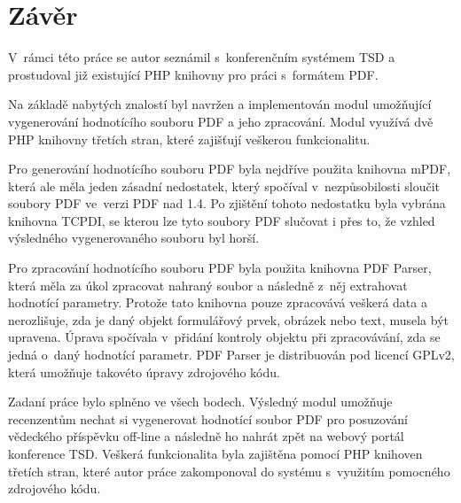 \chapter{Závěr}
 V~rámci této práce se autor seznámil s~konferenčním systémem TSD a prostudoval již existující PHP knihovny pro práci s~formátem PDF.
\par
Na základě nabytých znalostí byl navržen a implementován modul umožňující vygenerování hodnotícího souboru PDF a jeho zpracování. Modul využívá dvě PHP knihovny třetích stran, které zajišťují veškerou funkcionalitu. 
\par
Pro generování hodnotícího souboru PDF byla nejdříve použita knihovna mPDF, která ale měla jeden zásadní nedostatek, který spočíval v~nezpůsobilosti sloučit soubory PDF ve~verzi PDF nad 1.4. Po zjištění tohoto nedostatku byla vybrána knihovna TCPDI, se kterou lze tyto soubory PDF slučovat i přes to, že vzhled výsledného vygenerovaného souboru byl horší.
\par
Pro zpracování hodnotícího souboru PDF byla použita knihovna PDF Parser, která měla za úkol zpracovat nahraný soubor a následně z~něj extrahovat hodnotící parametry. Protože tato knihovna pouze zpracovává veškerá data a nerozlišuje, zda je daný objekt formulářový prvek, obrázek nebo text, musela být upravena. Úprava spočívala v~přidání kontroly objektu při zpracovávání, zda se jedná o~daný hodnotící parametr. PDF Parser je distribuován pod licencí GPLv2, která umožňuje takovéto úpravy zdrojového kódu.
\par
Zadaní práce bylo splněno ve všech bodech. Výsledný modul umožňuje recenzentům nechat si vygenerovat hodnotící soubor PDF pro posuzování vědeckého příspěvku off-line a následně ho nahrát zpět na webový portál konference TSD. Veškerá funkcionalita byla zajištěna pomocí PHP knihoven třetích stran, které autor práce zakomponoval do systému s~využitím pomocného zdrojového kódu.